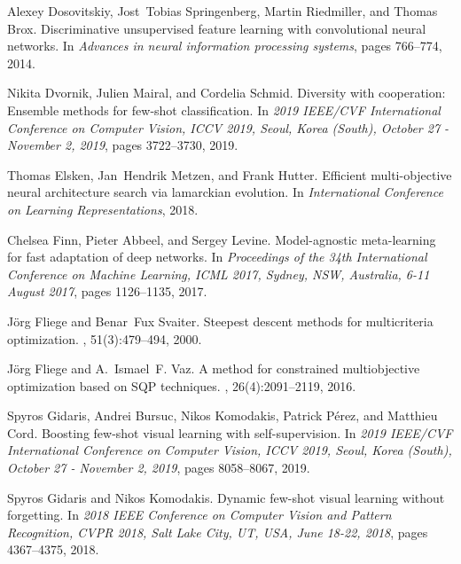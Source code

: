 \documentclass[final]{cvpr}
\begin{document}
\begin{thebibliography}{10}
	Alexey Dosovitskiy, Jost~Tobias Springenberg, Martin Riedmiller, and Thomas
	Brox.
	\newblock Discriminative unsupervised feature learning with convolutional
	neural networks.
	\newblock In {\em Advances in neural information processing systems}, pages
	766--774, 2014.
	
	Nikita Dvornik, Julien Mairal, and Cordelia Schmid.
	\newblock Diversity with cooperation: Ensemble methods for few-shot
	classification.
	\newblock In {\em 2019 {IEEE/CVF} International Conference on Computer Vision,
		{ICCV} 2019, Seoul, Korea (South), October 27 - November 2, 2019}, pages
	3722--3730, 2019.
	
	Thomas Elsken, Jan~Hendrik Metzen, and Frank Hutter.
	\newblock Efficient multi-objective neural architecture search via lamarckian
	evolution.
	\newblock In {\em International Conference on Learning Representations}, 2018.
	
	Chelsea Finn, Pieter Abbeel, and Sergey Levine.
	\newblock Model-agnostic meta-learning for fast adaptation of deep networks.
	\newblock In {\em Proceedings of the 34th International Conference on Machine
		Learning, {ICML} 2017, Sydney, NSW, Australia, 6-11 August 2017}, pages
	1126--1135, 2017.
	
	J{\"o}rg Fliege and Benar~Fux Svaiter.
	\newblock Steepest descent methods for multicriteria optimization.
	, 51(3):479--494,
	2000.
	
	J{\"{o}}rg Fliege and A.~Ismael~F. Vaz.
	\newblock A method for constrained multiobjective optimization based on {SQP}
	techniques.
	, 26(4):2091--2119, 2016.
	
	Spyros Gidaris, Andrei Bursuc, Nikos Komodakis, Patrick P{\'{e}}rez, and
	Matthieu Cord.
	\newblock Boosting few-shot visual learning with self-supervision.
	\newblock In {\em 2019 {IEEE/CVF} International Conference on Computer Vision,
		{ICCV} 2019, Seoul, Korea (South), October 27 - November 2, 2019}, pages
	8058--8067, 2019.
	
	Spyros Gidaris and Nikos Komodakis.
	\newblock Dynamic few-shot visual learning without forgetting.
	\newblock In {\em 2018 {IEEE} Conference on Computer Vision and Pattern
		Recognition, {CVPR} 2018, Salt Lake City, UT, USA, June 18-22, 2018}, pages
	4367--4375, 2018.
	

\end{thebibliography}
\end{document}
